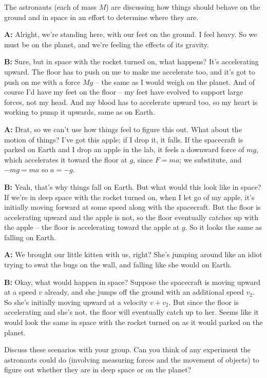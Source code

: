 \documentclass[12pt]{article}
\begin{document}
The astronauts (each of mass $M$) are discussing how things should behave on the ground and in space in an effort to determine where they are.

\begin{center}\underline{\hspace{4in}}\end{center}

{\bf A:} Alright, we're standing here, with our feet on the ground. I feel heavy. So we must be on the planet, and we're feeling the effects of its gravity.

{\bf B:} Sure, but in space with the rocket turned on, what happens? It's accelerating upward. The floor has to push on me to make me accelerate too, and it's got to push on me with a force $Mg$ -- the same as I would weigh on the planet. And of course I'd have my feet on the floor -- my feet have evolved to support large forces, not my head. And my blood has to accelerate upward too, so my heart is working to pump it upwards, same as on Earth.

{\bf A:} Drat, so we can't use how things feel to figure this out. What about the motion of things? I've got this apple; if I drop it, it falls. If the spacecraft is parked on Earth and I drop an apple in the lab, it feels a downward force of $mg$, which accelerates it toward the floor at $g$, since $F = ma$; we substitute, and $-mg = ma$ so $a = -g$. 

{\bf B:} Yeah, that's why things fall on Earth. But what would this look like in space? If we're in deep space with the rocket turned on, when I let go of my apple, it's initially moving forward at some speed along with the spacecraft. But the floor is accelerating upward and the apple is not, so the floor eventually catches up with the apple -- the floor is accelerating toward the apple at $g$. So it looks the same as falling on Earth.

{\bf A:} We brought our little kitten with us, right? She's jumping around like an idiot trying to swat the bugs on the wall, and falling like she would on Earth.

{\bf B:} Okay, what would happen in space? Suppose the spacecraft is moving upward at a speed $v$ already, and she jumps off the ground with an additional speed $v_2$. So she's initially moving upward at a velocity $v + v_2$. But since the floor is accelerating and she's not, the floor will eventually catch up to her. Seems like it would look the same in space with the rocket turned on as it would parked on the planet.
\begin{center}\underline{\hspace{4in}}\end{center}


Discuss these scenarios with your group. Can you think of any experiment the astronauts could do (involving measuring forces and the movement of objects) to figure out whether they are in deep space or on the planet?
\end{document}
